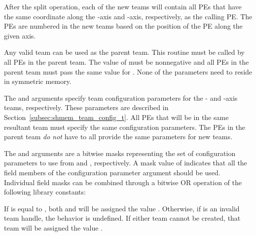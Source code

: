 \begin{apidefinition}
{After the split operation, each of the new teams will contain all \acp{PE} that
have the same coordinate along the -axis and -axis, respectively, as the calling
\ac{PE}. The \acp{PE} are numbered in the new teams based on the position of the
\ac{PE} along the given axis.

Any valid \openshmem team can be used as the parent team. This routine must be
called by all \acp{PE} in the parent team. The value of  must be
nonnegative and all \acp{PE} in the parent team must pass the same value for
. None of the parameters need to reside in symmetric memory.

The  and  arguments specify team
configuration parameters for the - and -axis teams, respectively.
These parameters are described in Section~\ref{subsec:shmem_team_config_t}.
All \acp{PE} that will be in the same resultant team must specify the same
configuration parameters.
The \acp{PE} in the parent team \emph{do not} have to all provide the same
parameters for new teams.

The  and arguments are a bitwise masks
representing the set of configuration parameters to use from
 and , respectively.
A mask value of  indicates that all the field members of the
configuration parameter argument should be used.
Individual field masks can be combined through a bitwise OR operation
of the following library constants:

{
}

If  is equal to , both
 and  will be assigned the value
.
Otherwise, if  is an invalid team handle,
the behavior is undefined.
If either team cannot be created, that team will be assigned the value
.
}


\end{apidefinition}
